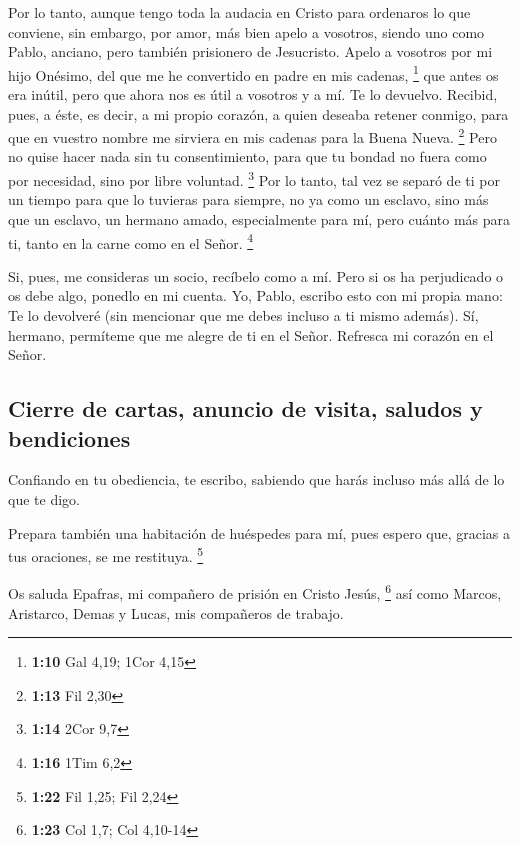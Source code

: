 \begin{paracol}{2}
 Por lo tanto, aunque tengo toda la audacia en Cristo para
ordenaros lo que conviene,  sin embargo, por amor, más
bien apelo a vosotros, siendo uno como Pablo, anciano, pero también
prisionero de Jesucristo.  Apelo a vosotros por mi hijo
Onésimo, del que me he convertido en padre en mis cadenas, \footnote{\textbf{1:10}
  Gal 4,19; 1Cor 4,15}  que antes os era inútil, pero que
ahora nos es útil a vosotros y a mí.  Te lo devuelvo.
Recibid, pues, a éste, es decir, a mi propio corazón,  a
quien deseaba retener conmigo, para que en vuestro nombre me sirviera en
mis cadenas para la Buena Nueva. \footnote{\textbf{1:13} Fil 2,30}
 Pero no quise hacer nada sin tu consentimiento, para que
tu bondad no fuera como por necesidad, sino por libre voluntad.
\footnote{\textbf{1:14} 2Cor 9,7}  Por lo tanto, tal vez
se separó de ti por un tiempo para que lo tuvieras para siempre,
 no ya como un esclavo, sino más que un esclavo, un
hermano amado, especialmente para mí, pero cuánto más para ti, tanto en
la carne como en el Señor. \footnote{\textbf{1:16} 1Tim 6,2}

 Si, pues, me consideras un socio, recíbelo como a mí.
 Pero si os ha perjudicado o os debe algo, ponedlo en mi
cuenta.  Yo, Pablo, escribo esto con mi propia mano: Te
lo devolveré (sin mencionar que me debes incluso a ti mismo además).
 Sí, hermano, permíteme que me alegre de ti en el Señor.
Refresca mi corazón en el Señor.

\hypertarget{cierre-de-cartas-anuncio-de-visita-saludos-y-bendiciones}{%
\subsection{Cierre de cartas, anuncio de visita, saludos y
bendiciones}\label{cierre-de-cartas-anuncio-de-visita-saludos-y-bendiciones}}

 Confiando en tu obediencia, te escribo, sabiendo que
harás incluso más allá de lo que te digo.

 Prepara también una habitación de huéspedes para mí,
pues espero que, gracias a tus oraciones, se me restituya. \footnote{\textbf{1:22}
  Fil 1,25; Fil 2,24}

 Os saluda Epafras, mi compañero de prisión en Cristo
Jesús, \footnote{\textbf{1:23} Col 1,7; Col 4,10-14}  así
como Marcos, Aristarco, Demas y Lucas, mis compañeros de trabajo.


\end{paracol}

